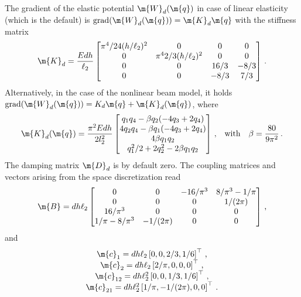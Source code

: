 The gradient of the elastic potential $\m{W}_{d}(\m{q})$ in case of linear elasticity (which is the default) is $\mathrm{grad}(\m{W}_{d}(\m{q})) = \m{K}_{d} \m{q}$ with the stiffness matrix
%
\begin{equation*}
  \m{K}_{d} = \dfrac{E d h}{\ell_2} \begin{bmatrix}
    \pi^4/24(h/\ell_2)^2 & 0                    & 0    & 0    \\
    0                   & \pi^4 2/3(h/\ell_2)^2 & 0    & 0    \\
    0                   & 0                     & 16/3 & -8/3 \\
    0                   & 0                     & -8/3 & 7/3
  \end{bmatrix} \, \text{.}
\end{equation*}
%
Alternatively, in the case of the nonlinear beam model, it holds $\mathrm{grad}(\m{W}_{d}(\m{q})) = K_{d}\m{q} + \m{K}_{d}(\m{q})$, where
%
\begin{equation*}
  \m{K}_{d}(\m{q}) = \dfrac{\pi^2 E d h}{2l_2^2} \begin{bmatrix}
    q_1 q_4 - \beta q_2(-4q_3 + 2q_4) \\
    4 q_2 q_4 - \beta q_1(-4q_3 + 2q_4) \\
    4 \beta q_1 q_2 \\
    q_1^2/2 + 2q_2^2 - 2 \beta q_1 q_2
  \end{bmatrix} \, \text{,}
  \quad \text{with} \quad
  \beta = \dfrac{80}{9\pi^2} \, \text{.}
\end{equation*}
%
The damping matrix $\m{D}_{d}$ is by default zero. The coupling matrices and vectors arising from the space discretization read
%
\begin{equation*}
  \m{B} = d h \ell_2 \begin{bmatrix}
    0             & 0         & -16/\pi^3 & 8/\pi^3-1/\pi \\
    0             & 0         & 0         & 1/(2\pi)      \\
    16/\pi^3      & 0         & 0         & 0             \\
    1/\pi-8/\pi^3 & -1/(2\pi) & 0         & 0
  \end{bmatrix} \, \text{,}
\end{equation*}
%
and
%
\begin{equation*}
  \begin{matrix}
    \m{c}_{1}  = d h \ell_2  \left[ 0,     0,         2/3, 1/6 \right]^\top \, \text{,} \\
    \m{c}_{2}  = d h \ell_2  \left[ 2/\pi, 0,         0,   0   \right]^\top \, \text{,} \\
    \m{c}_{12} = d h \ell_2^2\left[ 0,     0,         1/3, 1/6 \right]^\top \, \text{,} \\
    \m{c}_{21} = d h \ell_2^2\left[ 1/\pi, -1/(2\pi), 0,   0   \right]^\top \, \text{.}
  \end{matrix}
\end{equation*}

